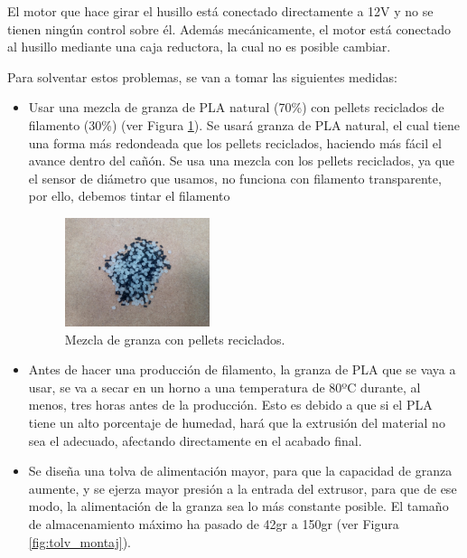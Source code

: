 El motor que hace girar el husillo está conectado directamente a 12V y no se tienen ningún control sobre él. Además mecánicamente, el motor está conectado al husillo mediante una caja reductora, la cual no es posible cambiar.

Para solventar estos problemas, se van a tomar las siguientes medidas:

\begin{itemize}
    \item{Usar una mezcla de granza de PLA natural (70\%) con pellets reciclados de filamento (30\%) (ver Figura \ref{fig:2007105-mezc}). Se usará granza de PLA natural, el cual tiene una forma más redondeada que los pellets reciclados, haciendo más fácil el avance dentro del cañón. Se usa una mezcla con los pellets reciclados, ya que el sensor de diámetro que usamos, no funciona con filamento transparente, por ello, debemos tintar el filamento}
	    \begin{figure}[H]
		    \centering
		    \includegraphics[width=0.4\textwidth]{images/producciones/20072015/IMG_20150903_155859.jpg}
		    \caption{Mezcla de granza con pellets reciclados.}
		    \label{fig:2007105-mezc}
		\end{figure}
    \item{Antes de hacer una producción de filamento, la granza de PLA que se vaya a usar, se va a secar en un horno a una temperatura de 80ºC durante, al menos, tres horas antes de la producción. Esto es debido a que si el PLA tiene un alto porcentaje de humedad, hará que la extrusión del material no sea el adecuado, afectando directamente en el acabado final.}
    \item{Se diseña una tolva de alimentación mayor, para que la capacidad de granza aumente, y se ejerza mayor presión a la entrada del extrusor, para que de ese modo, la alimentación de la granza sea lo más constante posible. El tamaño de almacenamiento máximo ha pasado de 42gr a 150gr (ver Figura \ref{fig:tolv_montaj}).}
\end{itemize}

